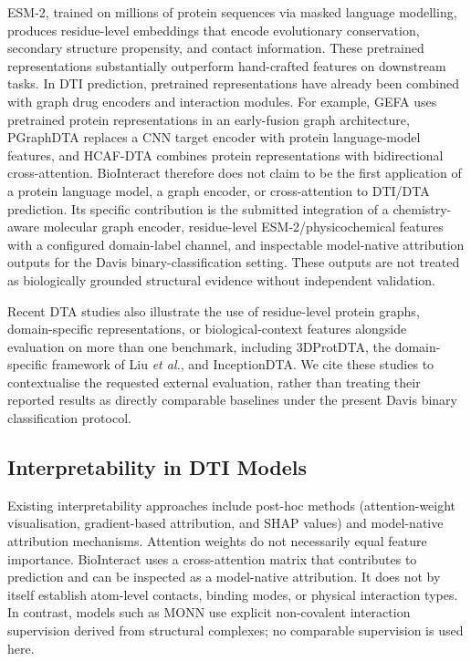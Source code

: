 \documentclass[fleqn,10pt]{wlscirep}
\begin{document}
ESM-2,\cite{lin2023evolutionary} trained on millions of protein sequences
via masked language modelling, produces residue-level embeddings that encode
evolutionary conservation, secondary structure propensity, and contact
information.  These pretrained representations substantially outperform
hand-crafted features on downstream tasks.\cite{rives2021biological}  In DTI
prediction, pretrained representations have already been combined with graph
drug encoders and interaction modules.  For example, GEFA uses pretrained
protein representations in an early-fusion graph architecture,\cite{nguyen2022gefa}
PGraphDTA replaces a CNN target encoder with protein language-model features,
\cite{bal2023pgraphdta} and HCAF-DTA combines protein representations with
bidirectional cross-attention.\cite{li2025hcafdta}  BioInteract therefore does
not claim to be the first application of a protein language model, a graph
encoder, or cross-attention to DTI/DTA prediction.  Its specific contribution is
the submitted integration of a chemistry-aware molecular graph encoder,
residue-level ESM-2/physicochemical features with a configured domain-label
channel, and inspectable model-native attribution
outputs for the Davis binary-classification setting.  These outputs are not
treated as biologically grounded structural evidence without independent
validation.

Recent DTA studies also illustrate the use of residue-level protein graphs,
domain-specific representations, or biological-context features alongside
evaluation on more than one benchmark, including 3DProtDTA,\cite{voitsitskyi2023_3dprotdta}
the domain-specific framework of Liu \textit{et al.},\cite{liu2024domainspecific}
and InceptionDTA.\cite{kalemati2025inceptiondta}  We cite these studies to
contextualise the requested external evaluation, rather than treating their
reported results as directly comparable baselines under the present Davis binary
classification protocol.

\subsection{Interpretability in DTI Models}

Existing interpretability approaches include post-hoc methods (attention-weight
visualisation, gradient-based attribution, and SHAP values\cite{jimenez2020drug})
and model-native attribution mechanisms.  Attention weights do not necessarily
equal feature importance.\cite{jain2019attention}  BioInteract uses a
cross-attention matrix that contributes to prediction and can be inspected as a
model-native attribution.  It does not by itself establish atom-level contacts,
binding modes, or physical interaction types.  In contrast, models such as
MONN use explicit non-covalent interaction supervision derived from structural
complexes;\cite{li2020monn} no comparable supervision is used here.
\end{document}
